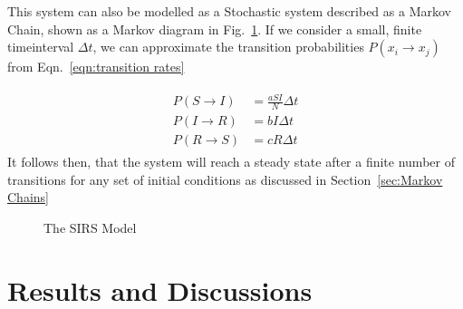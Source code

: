 \documentclass[10pt,showpacs,preprintnumbers,amsmath,amssymb,nofootinbib,aps,prl,twocolumn,groupedaddress,superscriptaddress,showkeys]{revtex4-1}
\begin{document}
    This system can also be modelled as a Stochastic system described as a Markov Chain, shown as a Markov diagram in Fig.~\ref{fig:SIRS diagram}. If we consider a small, finite timeinterval $\Delta t$, we can approximate the transition probabilities $P(x_i \rightarrow x_j)$ from Eqn.~\ref{eqn:transition rates}

    \begin{align}
      \begin{split}
        P(S\rightarrow I) &= \frac{aSI}{N}\Delta t
          \\
        P(I\rightarrow R) &= bI\Delta t
          \\
        P(R\rightarrow S) &= cR\Delta t
      \end{split}
    \end{align}
    It follows then, that the system will reach a steady state after a finite number of transitions for any set of initial conditions as discussed in Section~\ref{sec:Markov Chains}

    \begin{figure}[h!tb]
      \centering 
       \caption{The SIRS Model\label{fig:SIRS diagram}}
    \end{figure}



\section{Results and Discussions}
\end{document}
